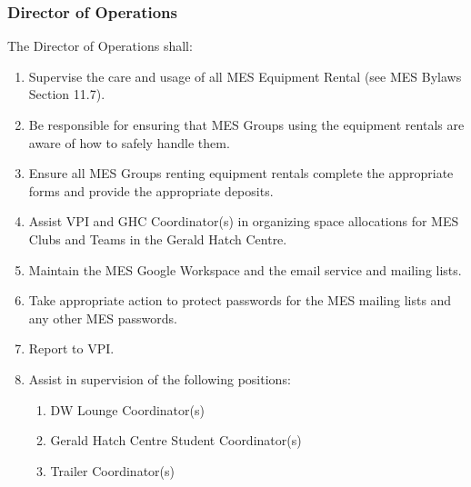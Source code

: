 
\subsubsection{Director of Operations}
\label{director-of-operations}
The Director of Operations shall: 

\begin{enumerate} 
  \item   
   Supervise the care and usage of all MES Equipment Rental (see MES Bylaws Section 11.7). 
  \item    
   Be responsible for ensuring that MES Groups using the equipment rentals are aware of how to safely handle them. 
  \item    
   Ensure all MES Groups renting equipment rentals complete the appropriate forms and provide the appropriate deposits. 
  \item    
   Assist VPI and GHC Coordinator(s) in organizing space allocations for MES Clubs and Teams in the Gerald Hatch Centre. 
  \item     
   Maintain the MES Google Workspace and the email service and mailing lists. 
  \item    
   Take appropriate action to protect passwords for the MES mailing lists and any other MES passwords. 
  \item    
   Report to VPI. 
  \item    
   Assist in supervision of the following positions: 
  
  \begin{enumerate} 
   \item    
    DW Lounge Coordinator(s) 
   \item     
    Gerald Hatch Centre Student Coordinator(s)    
   \item    
    Trailer Coordinator(s)   
  \end{enumerate} 
\end{enumerate}
  